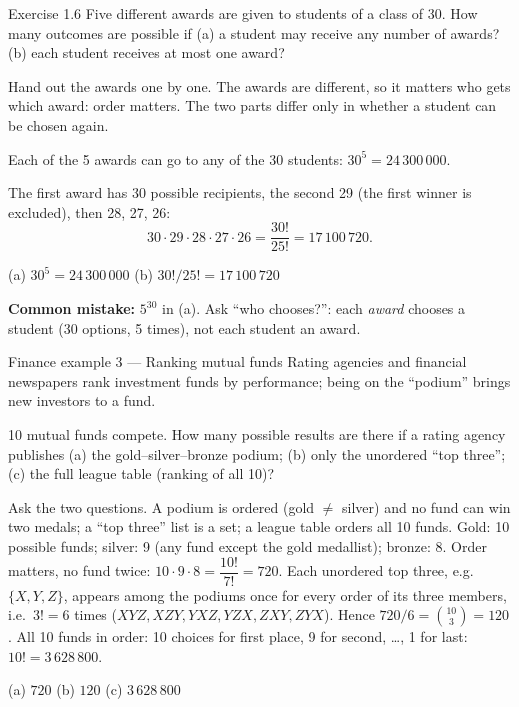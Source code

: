 \begin{task}{Exercise 1.6}
	Five different awards are given to students of a class of 30. How many
	outcomes are possible if (a) a student may receive any number of awards?
	(b) each student receives at most one award?
\end{task}
\workspace{2.5cm}

\ifsolutions
	\soltitle
	\idea Hand out the awards one by one. The awards are different, so it
	matters who gets which award: order matters. The two parts differ only in
	whether a student can be chosen again.

	 Each of the 5 awards can go to any of the 30 students:
	$30^5 = 24\,300\,000$.

	 The first award has 30 possible recipients, the second 29 (the
	first winner is excluded), then 28, 27, 26:
	\[ 30\cdot29\cdot28\cdot27\cdot26 = \frac{30!}{25!} = 17\,100\,720. \]
	\begin{answer}
		(a) $30^5=24\,300\,000$ \qquad (b) $30!/25!=17\,100\,720$
	\end{answer}
	\begin{remark}
		\textbf{Common mistake:} $5^{30}$ in (a). Ask ``who chooses?'': each
		\emph{award} chooses a student (30 options, 5 times), not each student an
		award.
	\end{remark}
\fi

\begin{fin}{Finance example 3 --- Ranking mutual funds}
	\context Rating agencies and financial newspapers rank investment funds by
	performance; being on the ``podium'' brings new investors to a fund.

	10 mutual funds compete. How many possible results are there if a rating
	agency publishes (a) the gold--silver--bronze podium; (b) only the
	unordered ``top three''; (c) the full league table (ranking of all 10)?
\end{fin}
\workspace{2cm}

\ifsolutions
	\soltitle
	\idea Ask the two questions. A podium is ordered (gold $\ne$ silver) and no
	fund can win two medals; a ``top three'' list is a set; a league table orders
	all 10 funds.
	 Gold: 10 possible funds; silver: 9 (any fund except the gold
	medallist); bronze: 8. Order matters, no fund twice:
	$10\cdot9\cdot8=\dfrac{10!}{7!}=720$.
	 Each unordered top three, e.g.\ $\{X,Y,Z\}$, appears among the
	podiums once for every order of its three members, i.e.\ $3!=6$ times
	($XYZ, XZY, YXZ, YZX, ZXY, ZYX$). Hence
	$720/6=\binom{10}{3}=120$.
	 All 10 funds in order: 10 choices for first place, 9 for second,
	\ldots, 1 for last: $10! = 3\,628\,800$.
	\begin{answer}
		(a) $720$ \quad (b) $120$ \quad (c) $3\,628\,800$
	\end{answer}
\fi

